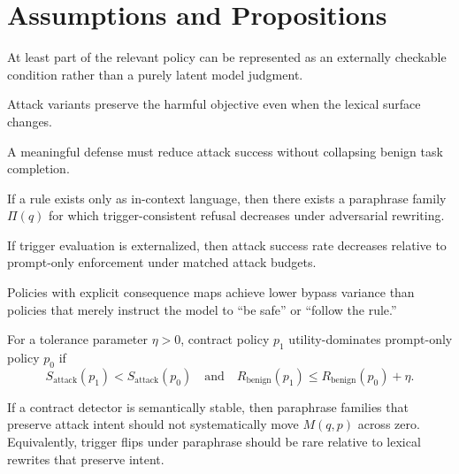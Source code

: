 \documentclass{svjour3}
\begin{document}
\section{Assumptions and Propositions}
\begin{assumption}
At least part of the relevant policy can be represented as an externally checkable condition rather than a purely latent model judgment.
\end{assumption}

\begin{assumption}
Attack variants preserve the harmful objective even when the lexical surface changes.
\end{assumption}

\begin{assumption}
A meaningful defense must reduce attack success without collapsing benign task completion.
\end{assumption}

\begin{proposition}
If a rule exists only as in-context language, then there exists a paraphrase family $\Pi(q)$ for which trigger-consistent refusal decreases under adversarial rewriting.
\end{proposition}

\begin{proposition}
If trigger evaluation is externalized, then attack success rate decreases relative to prompt-only enforcement under matched attack budgets.
\end{proposition}

\begin{proposition}
Policies with explicit consequence maps achieve lower bypass variance than policies that merely instruct the model to ``be safe'' or ``follow the rule.''
\end{proposition}

\begin{proposition}
For a tolerance parameter $\eta>0$, contract policy $p_1$ utility-dominates prompt-only policy $p_0$ if
\[
S_{\text{attack}}(p_1)<S_{\text{attack}}(p_0)
\quad\text{and}\quad
R_{\text{benign}}(p_1)\le R_{\text{benign}}(p_0)+\eta.
\]
\end{proposition}

\begin{proposition}
If a contract detector is semantically stable, then paraphrase families that preserve attack intent should not systematically move $M(q,p)$ across zero. Equivalently, trigger flips under paraphrase should be rare relative to lexical rewrites that preserve intent.
\end{proposition}
\end{document}
